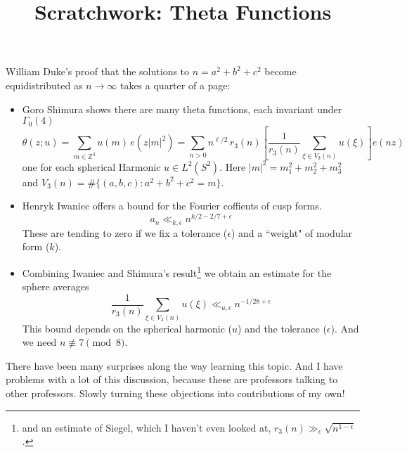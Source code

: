 \documentclass[12pt]{article}
\title{Scratchwork: Theta Functions}
\date{}
\begin{document}

\sffamily

\maketitle

\noindent William Duke's proof that the solutions to $n = a^2 + b^2 + c^2$ become equidistributed as $n \to \infty$ takes a quarter of a page:
\begin{itemize}
\item Goro Shimura shows there are many theta functions, each invariant under $\Gamma_0(4)$
$$ \theta(z;u) = \sum_{m \in \mathbb{Z}^3} u(m) \, e(z |m|^2) =
\sum_{n > 0} n^{\ell / 2}\, r_3(n) \left[ \frac{1}{r_3(n)} \sum_{\xi \in V_3(n)} u(\xi) \right] e ( n z)  $$
one for each spherical Harmonic $u \in L^2( S^2)$. Here $|m|^2 = m_1^2 + m_2^2 + m_3^2$ and $V_3(n) = \#\{ (a,b,c): a^2 + b^2 + c^2 = m \}$.
\item Henryk Iwaniec offers a bound for the Fourier coffients of cusp forms. 
$$ a_n \ll_{k, \epsilon} n^{k/2 - 2/7 + \epsilon} $$
These are tending to zero if we fix a tolerance  ($\epsilon$) and a ``weight" of modular form ($k$).
\item Combining Iwaniec and Shimura's result\footnote{and an estimate of Siegel, which I haven't even looked at, $r_3(n) \gg_\epsilon \sqrt{n^{1-\epsilon}} $.} we obtain an estimate for the sphere averages
$$  \frac{1}{r_3(n)} \sum_{\xi \in V_3(n)} u(\xi) \ll_{u,\epsilon} n^{-1/28 + \epsilon} $$
This bound depends on the spherical harmonic ($u$) and the tolerance ($\epsilon$).  And we need $n \not \equiv 7 \pmod 8$.  
\end{itemize}
There have been many surprises along the way learning this topic.  And I have problems with a lot of this discussion, because these are professors talking to other professors.  Slowly turning these objections into contributions of my own! 
\end{document}
